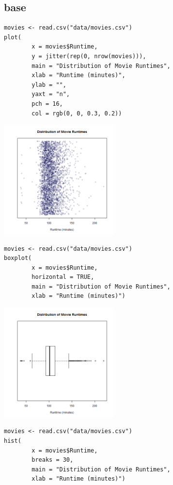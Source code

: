 \documentclass[a4paper, captions=tableheading]{tufte-book}
\begin{document}
\subsection{base}
\label{sec:orgheadline7}

\begin{verbatim}
movies <- read.csv("data/movies.csv")
plot(
		x = movies$Runtime,
		y = jitter(rep(0, nrow(movies))),
		main = "Distribution of Movie Runtimes",
		xlab = "Runtime (minutes)",
		ylab = "",
		yaxt = "n",
		pch = 16,
		col = rgb(0, 0, 0.3, 0.2))
\end{verbatim}

\includegraphics[height=6cm]{img/1-num-base-01.png}

\begin{verbatim}
movies <- read.csv("data/movies.csv")
boxplot(
		x = movies$Runtime,
		horizontal = TRUE,
		main = "Distribution of Movie Runtimes",
		xlab = "Runtime (minutes)")
\end{verbatim}

\includegraphics[height=6cm]{img/1-num-base-02.png}

\begin{verbatim}
movies <- read.csv("data/movies.csv")
hist(
		x = movies$Runtime,
		breaks = 30,
		main = "Distribution of Movie Runtimes",
		xlab = "Runtime (minutes)")
\end{verbatim}
\end{document}
